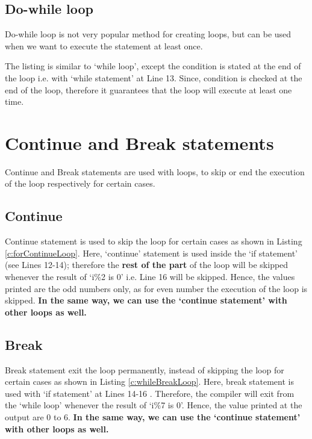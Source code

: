 

\subsection{Do-while loop}
Do-while loop is not very popular method for creating loops, but can be used when we want to execute the statement at least once. 
\begin{explanation}
	The listing is similar to `while loop', except the condition is stated at the end of the loop i.e. with `while statement' at Line 13. Since, condition is checked at the end of the loop, therefore it guarantees that the loop will execute at least one time. 
\end{explanation}



\section{Continue and Break statements}
Continue and Break statements are used with loops, to skip or end the execution of the loop respectively for certain cases. 

\subsection{Continue}
Continue statement is used to skip the loop for certain cases as shown in Listing \ref{c:forContinueLoop}. Here, `continue' statement is used inside the `if statement' (see Lines 12-14); therefore the \textbf{rest of the part} of the loop will be skipped whenever the result of `i$\%$2 is 0' i.e. Line 16 will be skipped. Hence, the values printed are the odd numbers only, as for even number the execution of the loop is skipped. \textbf{In the same way, we can use the `continue statement' with other loops as well.}



\subsection{Break}
Break statement exit the loop permanently, instead of skipping the loop for certain cases as shown in Listing \ref{c:whileBreakLoop}. Here, break statement is used with `if statement' at Lines 14-16		. Therefore, the compiler will exit from the `while loop' whenever the result of `i$\%$7 is 0'. Hence, the value printed at the output are 0 to 6. \textbf{In the same way, we can use the `continue statement' with other loops as well.}

